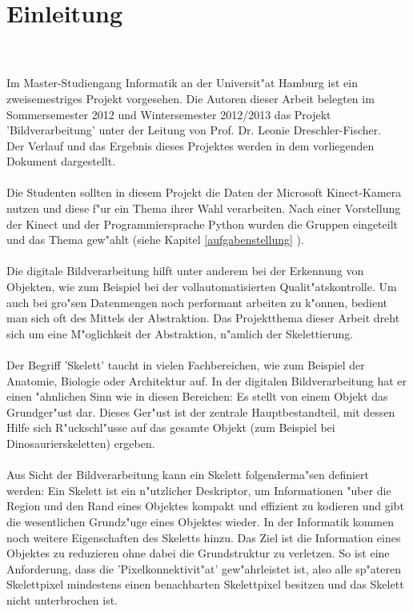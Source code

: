\chapter{Einleitung}
\label{ch:einleitung}
\\ \\
Im Master-Studiengang Informatik an der Universit"at Hamburg ist ein zweisemestriges Projekt vorgesehen. Die Autoren dieser Arbeit belegten im Sommersemester 2012 und Wintersemester 2012/2013 das Projekt 'Bildverarbeitung' unter der Leitung von Prof. Dr. Leonie Dreschler-Fischer. \\
Der Verlauf und das Ergebnis dieses Projektes werden in dem vorliegenden Dokument dargestellt.
\\ \\
Die Studenten sollten in diesem Projekt die Daten der Microsoft Kinect-Kamera nutzen und diese f"ur ein Thema ihrer Wahl verarbeiten. Nach einer Vorstellung der Kinect und der Programmiersprache Python wurden die Gruppen eingeteilt und das Thema gew"ahlt (siehe Kapitel \ref{aufgabenstellung} ).  \\ \\
Die digitale Bildverarbeitung hilft unter anderem bei der Erkennung von Objekten, wie zum Beispiel bei der vollautomatisierten Qualit"atskontrolle. Um auch bei gro"sen Datenmengen noch performant arbeiten zu k"onnen, bedient man sich oft des Mittels der Abstraktion. Das Projektthema dieser Arbeit dreht sich um eine M"oglichkeit der Abstraktion, n"amlich der Skelettierung. \\ \\
Der Begriff 'Skelett' taucht in vielen Fachbereichen, wie zum Beispiel der Anatomie, Biologie oder Architektur auf. In der digitalen Bildverarbeitung hat er einen "ahnlichen Sinn wie in diesen Bereichen: Es stellt von einem Objekt das Grundger"ust dar. Dieses Ger"ust ist der zentrale Hauptbestandteil, mit dessen Hilfe sich R"uckschl"usse auf das gesamte Objekt (zum Beispiel bei Dinosaurierskeletten) ergeben. \\ \\
Aus Sicht der Bildverarbeitung kann ein Skelett folgenderma"sen definiert werden: Ein Skelett ist ein n"utzlicher Deskriptor, um Informationen "uber die Region und den Rand eines Objektes kompakt und effizient zu kodieren und gibt die wesentlichen Grundz"uge eines Objektes wieder. In der Informatik kommen noch weitere Eigenschaften des Skeletts hinzu. Das Ziel ist die Information eines Objektes zu reduzieren ohne dabei die Grundstruktur zu verletzen. So ist eine Anforderung, dass die 'Pixelkonnektivit"at' gew"ahrleistet ist, also alle sp"ateren Skelettpixel mindestens einen benachbarten Skelettpixel besitzen und das Skelett nicht unterbrochen ist. \\ \\
